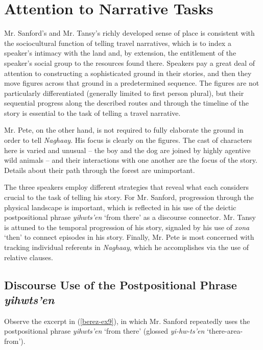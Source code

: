 \section{Attention to Narrative Tasks}

Mr. Sanford’s and Mr. Tansy’s richly developed sense of place is consistent with the sociocultural function of telling travel narratives, which is to index a speaker’s intimacy with the land and, by extension, the entitlement of the speaker’s social group to the resources found there. Speakers pay a great deal of attention to constructing a sophisticated ground in their stories, and then they move figures across that ground in a predetermined sequence. The figures are not particularly differentiated (generally limited to first person plural), but their sequential progress along the described routes and through the timeline of the story is essential to the task of telling a travel narrative.

Mr. Pete, on the other hand, is not required to fully elaborate the ground in order to tell \textit{Naghaay}. His focus is clearly on the figures. The cast of characters here is varied and unusual – the boy and the dog are joined by highly agentive wild animals – and their interactions with one another are the focus of the story. Details about their path through the forest are unimportant.

The three speakers employ different strategies that reveal what each considers crucial to the task of telling his story. For Mr. Sanford, progression through the physical landscape is important, which is reflected in his use of the deictic postpositional phrase \textit{yihwts’en} ‘from there’ as a discourse connector. Mr. Tansy is attuned to the temporal progression of his story, signaled by his use of \textit{xona} ‘then’ to connect episodes in his story. Finally, Mr. Pete is most concerned with tracking individual referents in \textit{Naghaay}, which he accomplishes via the use of relative clauses.

\subsection{Discourse Use of the Postpositional Phrase \textit{yihwts’en}}

Observe the excerpt in (\ref{berez-ex9}), in which Mr. Sanford repeatedly uses the postpositional phrase \textit{yihwts’en} ‘from there’ (glossed \textit{yi-hw-ts’en} ‘there-area-from’).


